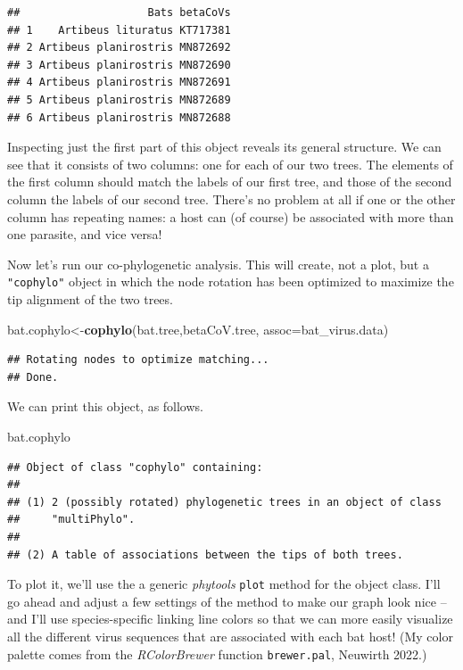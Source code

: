 \documentclass[fleqn,10pt,lineno]{wlpeerj} %
\newenvironment{Shaded}{\begin{snugshade}}{\end{snugshade}}
\newcommand{\AttributeTok}[1]{\textcolor[rgb]{0.13,0.29,0.53}{#1}}
\newcommand{\FunctionTok}[1]{\textcolor[rgb]{0.13,0.29,0.53}{\textbf{#1}}}
\newcommand{\NormalTok}[1]{#1}
\newcommand{\OtherTok}[1]{\textcolor[rgb]{0.56,0.35,0.01}{#1}}
\begin{document}
\begin{verbatim}
##                    Bats betaCoVs
## 1    Artibeus lituratus KT717381
## 2 Artibeus planirostris MN872692
## 3 Artibeus planirostris MN872690
## 4 Artibeus planirostris MN872691
## 5 Artibeus planirostris MN872689
## 6 Artibeus planirostris MN872688
\end{verbatim}

Inspecting just the first part of this object reveals its general structure. We can see that it consists of two columns: one for each of our two trees. The elements of the first column should match the labels of our first tree, and those of the second column the labels of our second tree. There's no problem at all if one or the other column has repeating names: a host can (of course) be associated with more than one parasite, and vice versa!

Now let's run our co-phylogenetic analysis. This will create, not a plot, but a \texttt{"cophylo"} object in which the node rotation has been optimized to maximize the tip alignment of the two trees.

\begin{Shaded}
\begin{Highlighting}[]
\NormalTok{bat.cophylo}\OtherTok{\textless{}{-}}\FunctionTok{cophylo}\NormalTok{(bat.tree,betaCoV.tree,}
  \AttributeTok{assoc=}\NormalTok{bat\_virus.data)}
\end{Highlighting}
\end{Shaded}

\begin{verbatim}
## Rotating nodes to optimize matching...
## Done.
\end{verbatim}

We can print this object, as follows.

\begin{Shaded}
\begin{Highlighting}[]
\NormalTok{bat.cophylo}
\end{Highlighting}
\end{Shaded}

\begin{verbatim}
## Object of class "cophylo" containing:
## 
## (1) 2 (possibly rotated) phylogenetic trees in an object of class 
##     "multiPhylo".
## 
## (2) A table of associations between the tips of both trees.
\end{verbatim}

To plot it, we'll use the a generic \emph{phytools} \texttt{plot} method for the object class. I'll go ahead and adjust a few settings of the method to make our graph look nice -- and I'll use species-specific linking line colors so that we can more easily visualize all the different virus sequences that are associated with each bat host! (My color palette comes from the \emph{RColorBrewer} function \texttt{brewer.pal}, Neuwirth 2022.)
\end{document}
